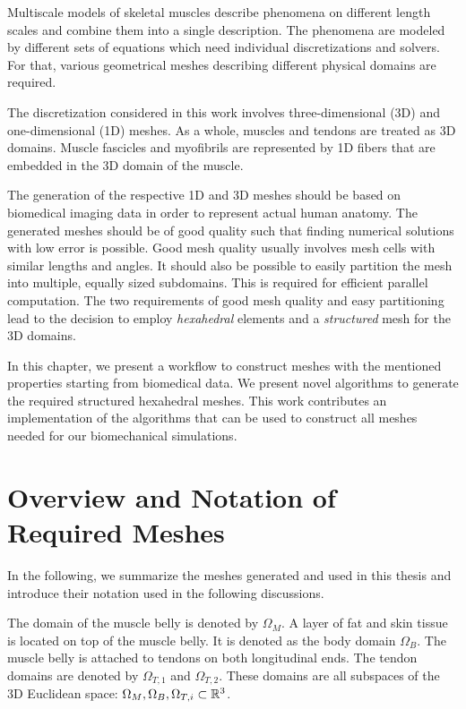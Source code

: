 
Multiscale models of skeletal muscles describe phenomena on different length scales and combine them into a single description. The phenomena are modeled by different sets of equations which need individual discretizations and solvers. For that, various geometrical meshes describing different physical domains are required.

The discretization considered in this work involves three-dimensional (3D) and one-dimensional (1D) meshes.
As a whole, muscles and tendons are treated as 3D domains. Muscle fascicles and myofibrils are represented by 1D fibers that are embedded in the 3D domain of the muscle.

The generation of the respective 1D and 3D meshes should be based on biomedical imaging data in order to represent actual human anatomy. The generated meshes should be of good quality such that finding numerical solutions with low error is possible. Good mesh quality usually involves mesh cells with similar lengths and angles. It should also be possible to easily partition the mesh into multiple, equally sized subdomains. This is required for efficient parallel computation.
The two requirements of good mesh quality and easy partitioning lead to the decision to employ \emph{hexahedral} elements and a \emph{structured} mesh for the 3D domains.

In this chapter, we present a workflow to construct meshes with the mentioned properties starting from biomedical data. We present novel algorithms to generate the required structured hexahedral meshes. This work contributes an implementation of the algorithms that can be used to construct all meshes needed for our biomechanical simulations.

\section{Overview and Notation of Required Meshes}\label{sec:overview_and_notation_of_required_meshes}
In the following, we summarize the meshes generated and used in this thesis and introduce their notation used in the following discussions.

The domain of the muscle belly is denoted by $\Omega_M$. A layer of fat and skin tissue is located on top of the muscle belly. It is denoted as the body domain $\Omega_B$.
The muscle belly is attached to tendons on both longitudinal ends. The tendon domains are denoted by $\Omega_{T,1}$ and $\Omega_{T,2}$. These domains are all subspaces of the 3D Euclidean space: $\Omega_M,\Omega_B,\Omega_{T,i} \subset \mathbb{R}^3$.


